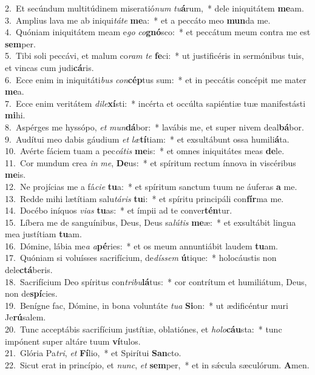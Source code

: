 {2.~}Et secúndum multitúdinem miseratió\textit{num} \textit{tu}\textbf{á}rum,~* dele iniquitátem \textbf{me}am.\\
{3.~}Amplius lava me ab iniqui\textit{tá}\textit{te} \textbf{me}a:~* et a peccáto meo \textbf{mun}da me.\\
{4.~}Quóniam iniquitátem meam e\textit{go} \textit{co}\textbf{gnó}sco:~* et peccátum meum contra me est \textbf{sem}per.\\
{5.~}Tibi soli peccávi, et malum co\textit{ram} \textit{te} \textbf{fe}ci:~* ut justificéris in sermónibus tuis, et vincas cum judi\textbf{cá}ris.\\
{6.~}Ecce enim in iniquitáti\textit{bus} \textit{con}\textbf{cép}tus sum:~* et in peccátis concépit me mater \textbf{me}a.\\
{7.~}Ecce enim veritátem \textit{di}\textit{le}\textbf{xí}sti:~* incérta et occúlta sapiéntiæ tuæ manifestásti \textbf{mi}hi.\\
{8.~}Aspérges me hyssópo, \textit{et} \textit{mun}\textbf{dá}bor:~* lavábis me, et super nivem deal\textbf{bá}bor.\\
{9.~}Audítui meo dabis gáudium \textit{et} \textit{læ}\textbf{tí}tiam:~* et exsultábunt ossa humili\textbf{á}ta.\\
{10.~}Avérte fáciem tuam a pec\textit{cá}\textit{tis} \textbf{me}is:~* et omnes iniquitátes meas \textbf{de}le.\\
{11.~}Cor mundum crea \textit{in} \textit{me}, \textbf{De}us:~* et spíritum rectum ínnova in viscéribus \textbf{me}is.\\
{12.~}Ne projícias me a fá\textit{ci}\textit{e} \textbf{tu}a:~* et spíritum sanctum tuum ne áuferas \textbf{a} me.\\
{13.~}Redde mihi lætítiam salu\textit{tá}\textit{ris} \textbf{tu}i:~* et spíritu principáli con\textbf{fír}ma me.\\
{14.~}Docébo iníquos \textit{vi}\textit{as} \textbf{tu}as:~* et ímpii ad te conver\textbf{tén}tur.\\
{15.~}Líbera me de sanguínibus, Deus, Deus sa\textit{lú}\textit{tis} \textbf{me}æ:~* et exsultábit lingua mea justítiam \textbf{tu}am.\\
{16.~}Dómine, lábia me\textit{a} \textit{a}\textbf{pé}ries:~* et os meum annuntiábit laudem \textbf{tu}am.\\
{17.~}Quóniam si voluísses sacrifícium, de\textit{dís}\textit{sem} \textbf{ú}tique:~* holocáustis non dele\textbf{ctá}beris.\\
{18.~}Sacrifícium Deo spíritus con\textit{tri}\textit{bu}\textbf{lá}tus:~* cor contrítum et humiliátum, Deus, non de\textbf{spí}cies.\\
{19.~}Benígne fac, Dómine, in bona voluntáte \textit{tu}\textit{a} \textbf{Si}on:~* ut ædificéntur muri Je\textbf{rú}salem.\\
{20.~}Tunc acceptábis sacrifícium justítiæ, oblatiónes, et \textit{ho}\textit{lo}\textbf{cáu}sta:~* tunc impónent super altáre tuum \textbf{ví}tulos.\\
{21.~}Glória Pa\textit{tri}, \textit{et} \textbf{Fí}lio,~* et Spirítui \textbf{San}cto.\\
{22.~}Sicut erat in princípio, et \textit{nunc}, \textit{et} \textbf{sem}per,~* et in sǽcula sæculórum. \textbf{A}men.\\
